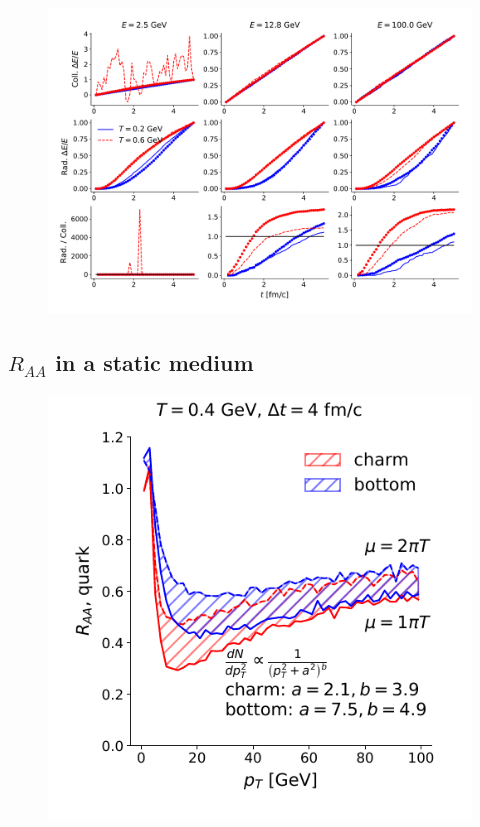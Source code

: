 \documentclass[aps, prc, reprint, amsmath, groupedaddress, nofootinbib]{revtex4-1}
\begin{document}
\begin{figure}
\includegraphics[width=\textwidth]{L_Eloss.pdf}
\caption{}\label{plots:dE-L}
\end{figure}

\subsection{$R_{AA}$ in a static medium}
\begin{figure}
\includegraphics[width=\columnwidth]{Box_Raa.pdf}
\end{figure}
\end{document}
